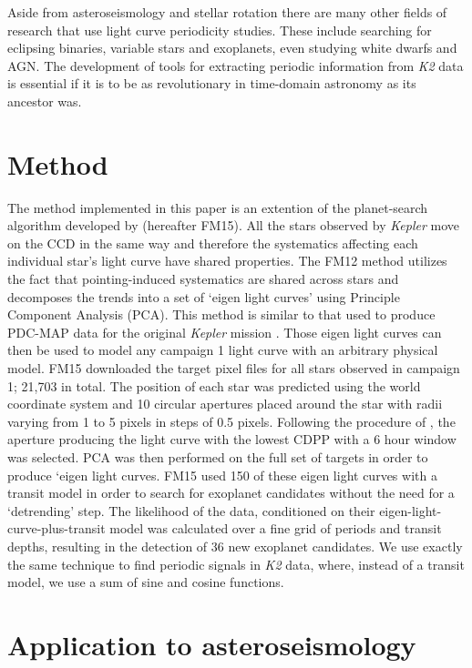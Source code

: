 \documentclass[useAMS, usenatbib]{aastex}
\begin{document}
Aside from asteroseismology and stellar rotation there are many other fields
of research that use light curve periodicity studies.
These include searching for eclipsing binaries, variable stars and exoplanets,
even studying white dwarfs and AGN.
The development of tools for extracting periodic information from {\it K2}
data is essential if it is to be as revolutionary in time-domain
astronomy as its ancestor was.

\section{Method}
\label{Method}

The method implemented in this paper is an extention of the planet-search
algorithm developed by \citet{Foreman-Mackey2015} (hereafter FM15).
All the stars observed by {\it Kepler} move on the CCD in the same way and
therefore the systematics affecting each individual star's light curve have
shared properties.
The FM12 method utilizes the fact that pointing-induced systematics are shared
across stars and decomposes the trends into a set of `eigen light curves'
using Principle Component Analysis (PCA).
This method is similar to that used to produce PDC-MAP data for the original
{\it Kepler} mission \citep[][]{Stumpe2012, Smith2012}.
Those eigen light curves can then be used to model any campaign 1 {\it }light
curve with an arbitrary physical model.
FM15 downloaded the target pixel files for all stars observed in campaign 1;
21,703 in total.
The position of each star was predicted using the world coordinate system and
10 circular apertures placed around the star with radii varying from 1 to
5 pixels in steps of 0.5 pixels.
Following the procedure of \citet{Vanderburg2014}, the aperture producing the
light curve with the lowest CDPP with a 6 hour window \citet{Christiansen2012}
was selected.
PCA was then performed on the full set of targets in order to produce `eigen
light curves.
FM15 used 150 of these eigen light curves with a transit model in order to
search for exoplanet candidates without the need for a `detrending' step.
The likelihood of the data, conditioned on their eigen-light-curve-plus-transit
model was calculated over a fine grid of periods and transit depths, resulting
in the detection of 36 new exoplanet candidates.
We use exactly the same technique to find periodic signals in {\it K2} data,
where, instead of a transit model, we use a sum of sine and cosine functions.

\section{Application to asteroseismology}
\end{document}
